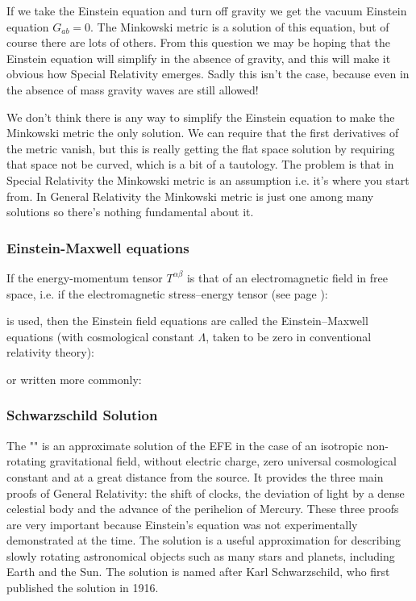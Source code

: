 	If we take the Einstein equation and turn off gravity we get the vacuum Einstein equation $G_{ab}=0$. The Minkowski metric is a solution of this equation, but of course there are lots of others. From this question we may be hoping that the Einstein equation will simplify in the absence of gravity, and this will make it obvious how Special Relativity emerges. Sadly this isn't the case, because even in the absence of mass gravity waves are still allowed!

	We don't think there is any way to simplify the Einstein equation to make the Minkowski metric the only solution. We can require that the first derivatives of the metric vanish, but this is really getting the flat space solution by requiring that space not be curved, which is a bit of a tautology. The problem is that in Special Relativity the Minkowski metric is an assumption i.e. it's where you start from. In General Relativity the Minkowski metric is just one among many solutions so there's nothing fundamental about it.
	
	\subsubsection{Einstein-Maxwell equations}
	If the energy-momentum tensor $T^{\alpha\beta}$ is that of an electromagnetic field in free space, i.e. if the electromagnetic stress–energy tensor (see page \pageref{electromagnetic stress energy tensor}):
	
	is used, then the Einstein field equations are called the Einstein–Maxwell equations (with cosmological constant $\Lambda$, taken to be zero in conventional relativity theory):
	
	or written more commonly:
	
	
	\pagebreak
	\subsubsection{Schwarzschild Solution}
	The "" is an approximate solution of the EFE  in the case of an isotropic non-rotating gravitational field, without electric charge, zero universal cosmological constant  and at a great distance from the source. It provides the three main proofs of General Relativity: the shift of clocks, the deviation of light by a dense celestial body and the advance of the perihelion of Mercury. These three proofs are very important because Einstein's equation was not experimentally demonstrated at the time.  The solution is a useful approximation for describing slowly rotating astronomical objects such as many stars and planets, including Earth and the Sun. The solution is named after Karl Schwarzschild, who first published the solution in 1916.

